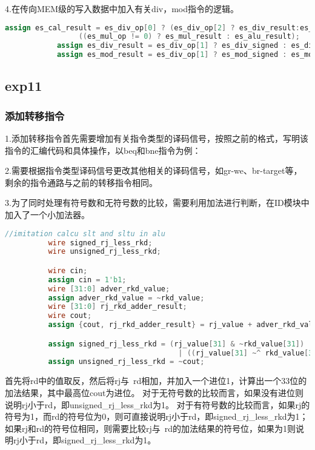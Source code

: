 \documentclass[12pt,a4paper]{article}
\begin{document}
            4.在传向MEM级的写入数据中加入有关div，mod指令的逻辑。
            \begin{lstlisting}[language=Verilog]
            assign es_cal_result = es_div_op[0] ? (es_div_op[2] ? es_div_result:es_mod_result ):
                 ((es_mul_op != 0) ? es_mul_result : es_alu_result);
            assign es_div_result = es_div_op[1] ? es_div_signed : es_div_unsigned;
            assign es_mod_result = es_div_op[1] ? es_mod_signed : es_mod_unsigned;
            \end{lstlisting}
            
    \subsection{exp11}
        \subsubsection{添加转移指令}
          1.添加转移指令首先需要增加有关指令类型的译码信号，按照之前的格式，写明该指令的汇编代码和具体操作，以beq和bne指令为例：
          \par
          2.需要根据指令类型译码信号更改其他相关的译码信号，如gr-we、br-target等，剩余的指令通路与之前的转移指令相同。
          \par
          3.为了同时处理有符号数和无符号数的比较，需要利用加法进行判断，在ID模块中加入了一个小加法器。
          \begin{lstlisting}[language=Verilog]
            //imitation calcu slt and sltu in alu
          wire signed_rj_less_rkd;
          wire unsigned_rj_less_rkd;

          wire cin;
          assign cin = 1'b1;
          wire [31:0] adver_rkd_value;
          assign adver_rkd_value = ~rkd_value;
          wire [31:0] rj_rkd_adder_result;
          wire cout;
          assign {cout, rj_rkd_adder_result} = rj_value + adver_rkd_value + cin;

          assign signed_rj_less_rkd = (rj_value[31] & ~rkd_value[31])
                                        | ((rj_value[31] ~^ rkd_value[31]) & rj_rkd_adder_result[31]);
          assign unsigned_rj_less_rkd = ~cout;  
          \end{lstlisting}
          首先将rd中的值取反，然后将rj与~rd相加，并加入一个进位1，计算出一个33位的加法结果，其中最高位cout为进位。
          对于无符号数的比较而言，如果没有进位则说明rj小于rd，即unsigned\_rj\_less\_rkd为1。
          对于有符号数的比较而言，如果rj的符号为1，而rd的符号位为0，则可直接说明rj小于rd，即signed\_rj\_less\_rkd为1；
          如果rj和rd的符号位相同，则需要比较rj与~rd的加法结果的符号位，如果为1则说明rj小于rd，即signed\_rj\_less\_rkd为1。
        
\end{document}
